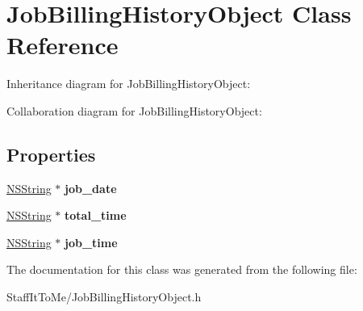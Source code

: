 \hypertarget{interface_job_billing_history_object}{
\section{\-Job\-Billing\-History\-Object \-Class \-Reference}
\label{interface_job_billing_history_object}
}


\-Inheritance diagram for \-Job\-Billing\-History\-Object\-:


\-Collaboration diagram for \-Job\-Billing\-History\-Object\-:
\subsection*{\-Properties}
\begin{DoxyCompactItemize}
\item 
\hypertarget{interface_job_billing_history_object_ab8561164dc8fbe80ae572da27d19245e}{
\hyperlink{class_n_s_string}{\-N\-S\-String} $\ast$ {\bfseries job\-\_\-date}}
\label{interface_job_billing_history_object_ab8561164dc8fbe80ae572da27d19245e}

\item 
\hypertarget{interface_job_billing_history_object_aabc9ae5ba9993989305728857fb383b0}{
\hyperlink{class_n_s_string}{\-N\-S\-String} $\ast$ {\bfseries total\-\_\-time}}
\label{interface_job_billing_history_object_aabc9ae5ba9993989305728857fb383b0}

\item 
\hypertarget{interface_job_billing_history_object_a43ad0e1c18a1975e2f50145fb6422671}{
\hyperlink{class_n_s_string}{\-N\-S\-String} $\ast$ {\bfseries job\-\_\-time}}
\label{interface_job_billing_history_object_a43ad0e1c18a1975e2f50145fb6422671}

\end{DoxyCompactItemize}


\-The documentation for this class was generated from the following file\-:\begin{DoxyCompactItemize}
\item 
\-Staff\-It\-To\-Me/\-Job\-Billing\-History\-Object.\-h\end{DoxyCompactItemize}
